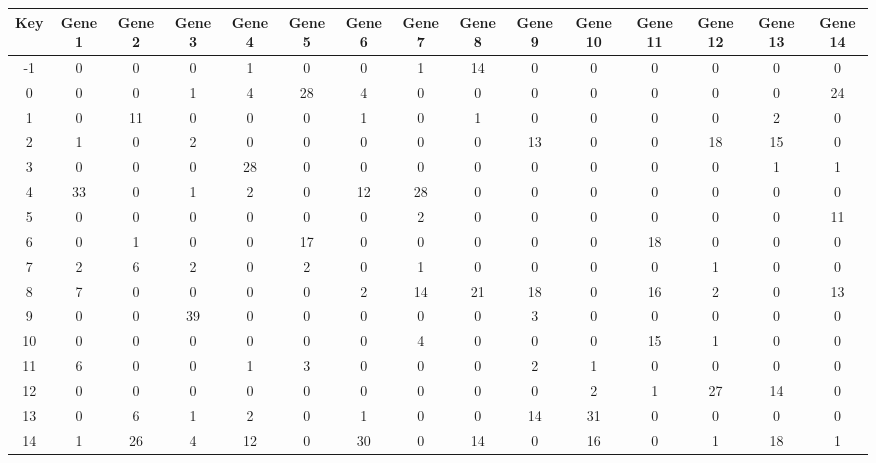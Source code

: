 \begin{tabular}{|c|c|c|c|c|c|c|c|c|c|c|c|c|c|c|}
\hline
Key & Gene 1 & Gene 2 & Gene 3 & Gene 4 & Gene 5 & Gene 6 & Gene 7 & Gene 8 & Gene 9 & Gene 10 & Gene 11 & Gene 12 & Gene 13 & Gene 14 \\
\hline
-1 & 0 & 0 & 0 & 1 & 0 & 0 & 1 & 14 & 0 & 0 & 0 & 0 & 0 & 0 \\
0 & 0 & 0 & 1 & 4 & 28 & 4 & 0 & 0 & 0 & 0 & 0 & 0 & 0 & 24 \\
1 & 0 & 11 & 0 & 0 & 0 & 1 & 0 & 1 & 0 & 0 & 0 & 0 & 2 & 0 \\
2 & 1 & 0 & 2 & 0 & 0 & 0 & 0 & 0 & 13 & 0 & 0 & 18 & 15 & 0 \\
3 & 0 & 0 & 0 & 28 & 0 & 0 & 0 & 0 & 0 & 0 & 0 & 0 & 1 & 1 \\
4 & 33 & 0 & 1 & 2 & 0 & 12 & 28 & 0 & 0 & 0 & 0 & 0 & 0 & 0 \\
5 & 0 & 0 & 0 & 0 & 0 & 0 & 2 & 0 & 0 & 0 & 0 & 0 & 0 & 11 \\
6 & 0 & 1 & 0 & 0 & 17 & 0 & 0 & 0 & 0 & 0 & 18 & 0 & 0 & 0 \\
7 & 2 & 6 & 2 & 0 & 2 & 0 & 1 & 0 & 0 & 0 & 0 & 1 & 0 & 0 \\
8 & 7 & 0 & 0 & 0 & 0 & 2 & 14 & 21 & 18 & 0 & 16 & 2 & 0 & 13 \\
9 & 0 & 0 & 39 & 0 & 0 & 0 & 0 & 0 & 3 & 0 & 0 & 0 & 0 & 0 \\
10 & 0 & 0 & 0 & 0 & 0 & 0 & 4 & 0 & 0 & 0 & 15 & 1 & 0 & 0 \\
11 & 6 & 0 & 0 & 1 & 3 & 0 & 0 & 0 & 2 & 1 & 0 & 0 & 0 & 0 \\
12 & 0 & 0 & 0 & 0 & 0 & 0 & 0 & 0 & 0 & 2 & 1 & 27 & 14 & 0 \\
13 & 0 & 6 & 1 & 2 & 0 & 1 & 0 & 0 & 14 & 31 & 0 & 0 & 0 & 0 \\
14 & 1 & 26 & 4 & 12 & 0 & 30 & 0 & 14 & 0 & 16 & 0 & 1 & 18 & 1 \\
\hline
\end{tabular}